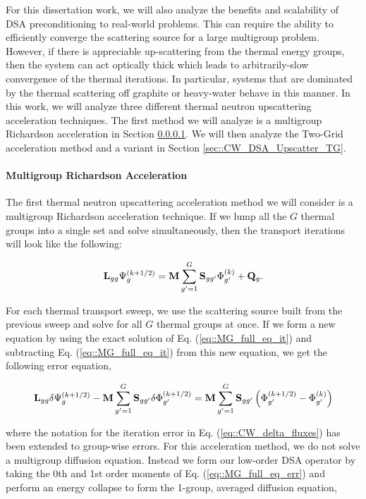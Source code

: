 \documentclass[11pt]{article}
\begin{document}
For this dissertation work, we will also analyze the benefits and scalability of DSA preconditioning to real-world problems. This can require the ability to efficiently converge the scattering source for a large multigroup problem. However, if there is appreciable up-scattering from the thermal energy groups, then the system can act optically thick which leads to arbitrarily-slow convergence of the thermal iterations. In particular, systems that are dominated by the thermal scattering off graphite or heavy-water behave in this manner. In this work, we will analyze three different thermal neutron upscattering acceleration techniques. The first method we will analyze is a multigroup Richardson acceleration in Section \ref{sec::CW_DSA_Upscatter_Rich}. We will then analyze the Two-Grid acceleration method and a variant in Section \ref{sec::CW_DSA_Upscatter_TG}.

\paragraph{Multigroup Richardson Acceleration}
\label{sec::CW_DSA_Upscatter_Rich}

The first thermal neutron upscattering acceleration method we will consider is a multigroup Richardson acceleration technique. If we lump all the $G$ thermal groups into a single set and solve simultaneously, then the transport iterations will look like the following:

\begin{equation}
\label{eq::MG_full_eq_it}
{\bf L}_{gg} \Psi_g^{(k+1/2)} =  {\bf M} \sum_{g'=1}^G {\bf S}_{g g'} \Phi_{g'}^{(k)} + {\bf Q}_g.
\end{equation}

\noindent For each thermal transport sweep, we use the scattering source built from the previous sweep and solve for all $G$ thermal groups at once. If we form a new equation by using the exact solution of Eq. (\ref{eq::MG_full_eq_it}) and subtracting Eq. (\ref{eq::MG_full_eq_it}) from this new equation, we get the following error equation, 

\begin{equation}
\label{eq::MG_full_eq_err}
{\bf L}_{gg} \delta \Psi_g^{(k+1/2)} - {\bf M} \sum_{g'=1}^G {\bf S}_{g g'} \delta \Phi_{g'}^{(k+1/2)}=  {\bf M} \sum_{g'=1}^G {\bf S}_{g g'}\left( \Phi_{g'}^{(k+1/2)}- \Phi_{g'}^{(k)} \right)
\end{equation}

\noindent where the notation for the iteration error in Eq. (\ref{eq::CW_delta_fluxes}) has been extended to group-wise errors. For this acceleration method, we do not solve a multigroup diffusion equation. Instead we form our low-order DSA operator by taking the 0th and 1st order moments of Eq. (\ref{eq::MG_full_eq_err}) and perform an energy collapse to form the 1-group, averaged diffusion equation,
\end{document}

